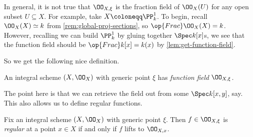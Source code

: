 \documentclass[../notes.tex]{subfiles}
\begin{document}
\begin{remark}
	In general, it is not true that $\OO_{X,\xi}$ is the fraction field of $\OO_X(U)$ for any open subset $U\subseteq X$. For example, take $X\coloneqq\PP^1_k$. To begin, recall $\OO_X(X)\simeq k$ from \autoref{rem:global-proj-sections}, so $\op{Frac}\OO_X(X)=k$. However, recalling we can build $\PP^1_k$ by gluing together $\Spec k[x]$s, we see that the function field should be $\op{Frac}k[x]=k(x)$ by \autoref{lem:get-function-field}.
\end{remark}
So we get the following nice definition.
\begin{definition}
	An integral scheme $(X,\OO_X)$ with generic point $\xi$ has \textit{function field} $\OO_{X,\xi}$.
\end{definition}
The point here is that we can retrieve the field out from some $\Spec k[x,y]$, say. This also allows us to define regular functions.
\begin{definition}[Regular]
	Fix an integral scheme $(X,\OO_X)$ with generic point $\xi$. Then $f\in\OO_{X,\xi}$ is \textit{regular} at a point $x\in X$ if and only if $f$ lifts to $\OO_{X,x}$.
\end{definition}
\end{document}
